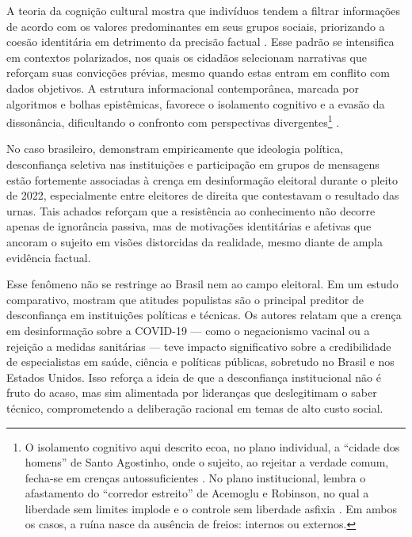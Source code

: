 A teoria da cognição cultural mostra que indivíduos tendem a filtrar informações de acordo com os valores predominantes em seus grupos sociais, priorizando a coesão identitária em detrimento da precisão factual \cite{kahan2012polarization}. Esse padrão se intensifica em contextos polarizados, nos quais os cidadãos selecionam narrativas que reforçam suas convicções prévias, mesmo quando estas entram em conflito com dados objetivos. A estrutura informacional contemporânea, marcada por algoritmos e bolhas epistêmicas, favorece o isolamento cognitivo e a evasão da dissonância, dificultando o confronto com perspectivas divergentes\footnote{O isolamento cognitivo aqui descrito ecoa, no plano individual, a “cidade dos homens” de Santo Agostinho, onde o sujeito, ao rejeitar a verdade comum, fecha-se em crenças autossuficientes \cite{agostinho1990civitate}. No plano institucional, lembra o afastamento do “corredor estreito” de Acemoglu e Robinson, no qual a liberdade sem limites implode e o controle sem liberdade asfixia \cite{acemoglu2019narrow}. Em ambos os casos, a ruína nasce da ausência de freios: internos ou externos.} \cite{sunstein2017republic}. 

No caso brasileiro,  demonstram empiricamente que ideologia política, desconfiança seletiva nas instituições e participação em grupos de mensagens estão fortemente associadas à crença em desinformação eleitoral durante o pleito de 2022, especialmente entre eleitores de direita que contestavam o resultado das urnas. Tais achados reforçam que a resistência ao conhecimento não decorre apenas de ignorância passiva, mas de motivações identitárias e afetivas que ancoram o sujeito em visões distorcidas da realidade, mesmo diante de ampla evidência factual.

Esse fenômeno não se restringe ao Brasil nem ao campo eleitoral. Em um estudo comparativo,  mostram que atitudes populistas são o principal preditor de desconfiança em instituições políticas e técnicas. Os autores relatam que a crença em desinformação sobre a COVID-19 — como o negacionismo vacinal ou a rejeição a medidas sanitárias — teve impacto significativo sobre a credibilidade de especialistas em saúde, ciência e políticas públicas, sobretudo no Brasil e nos Estados Unidos. Isso reforça a ideia de que a desconfiança institucional não é fruto do acaso, mas sim alimentada por lideranças que deslegitimam o saber técnico, comprometendo a deliberação racional em temas de alto custo social.

